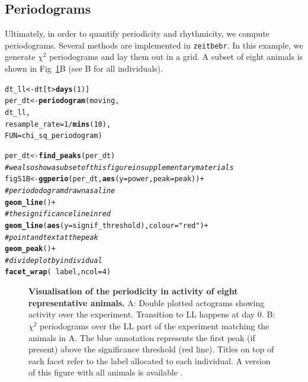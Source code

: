\documentclass[10pt,letterpaper]{article}\usepackage[]{graphicx}\usepackage[]{color}
\makeatletter
\newcommand{\hlnum}[1]{\textcolor[rgb]{0.686,0.059,0.569}{#1}}%
\newcommand{\hlstr}[1]{\textcolor[rgb]{0.192,0.494,0.8}{#1}}%
\newcommand{\hlcom}[1]{\textcolor[rgb]{0.678,0.584,0.686}{\textit{#1}}}%
\newcommand{\hlopt}[1]{\textcolor[rgb]{0,0,0}{#1}}%
\newcommand{\hlstd}[1]{\textcolor[rgb]{0.345,0.345,0.345}{#1}}%
\newcommand{\hlkwb}[1]{\textcolor[rgb]{0.69,0.353,0.396}{#1}}%
\newcommand{\hlkwc}[1]{\textcolor[rgb]{0.333,0.667,0.333}{#1}}%
\newcommand{\hlkwd}[1]{\textcolor[rgb]{0.737,0.353,0.396}{\textbf{#1}}}%
\newenvironment{kframe}{%
 \def\at@end@of@kframe{}%
 \ifinner\ifhmode%
  \def\at@end@of@kframe{\end{minipage}}%
  \begin{minipage}{\columnwidth}%
 \fi\fi%
 \def\FrameCommand##1{\hskip\@totalleftmargin \hskip-\fboxsep
 \colorbox{shadecolor}{##1}\hskip-\fboxsep
     \hskip-\linewidth \hskip-\@totalleftmargin \hskip\columnwidth}%
 \MakeFramed {\advance\hsize-\width
   \@totalleftmargin\z@ \linewidth\hsize
   \@setminipage}}%
 {\par\unskip\endMakeFramed%
 \at@end@of@kframe}
\newenvironment{knitrout}{}{} %
\makeatother
\begin{document}
\subsection*{Periodograms}
Ultimately, in order to quantify periodicity and rhythmicity, we compute periodograms.
Several methods are implemented in \texttt{zeitbebr}. In this example, we generate $\chi{}^2$ periodograms and lay them out in a grid.
A subset of eight animals is shown in Fig~\ref{fig:fig-4}B (see B for all individuals).

\begin{knitrout}
\color{fgcolor}\begin{kframe}
\begin{alltt}
\hlstd{dt_ll} \hlkwb{<-} \hlstd{dt[t} \hlopt{>} \hlkwd{days}\hlstd{(}\hlnum{1}\hlstd{)]}
\hlstd{per_dt} \hlkwb{<-} \hlkwd{periodogram}\hlstd{(moving,}
                        \hlstd{dt_ll,}
                        \hlkwc{resample_rate} \hlstd{=} \hlnum{1}\hlopt{/}\hlkwd{mins}\hlstd{(}\hlnum{10}\hlstd{),}
                        \hlkwc{FUN}\hlstd{=chi_sq_periodogram)}

\hlstd{per_dt} \hlkwb{<-} \hlkwd{find_peaks}\hlstd{(per_dt)}
\hlcom{# we also show a subset of this figure in supplementary materials}
\hlstd{figS1B} \hlkwb{<-} \hlkwd{ggperio}\hlstd{(per_dt,} \hlkwd{aes}\hlstd{(}\hlkwc{y} \hlstd{= power,} \hlkwc{peak}\hlstd{=peak))} \hlopt{+}
                  \hlcom{# periododogram drawn as a line}
                  \hlkwd{geom_line}\hlstd{()} \hlopt{+}
                  \hlcom{# the significance line in red}
                  \hlkwd{geom_line}\hlstd{(}\hlkwd{aes}\hlstd{(}\hlkwc{y} \hlstd{= signif_threshold),} \hlkwc{colour}\hlstd{=}\hlstr{"red"}\hlstd{)} \hlopt{+}
                  \hlcom{# point and text at the peak}
                  \hlkwd{geom_peak}\hlstd{()} \hlopt{+}
                  \hlcom{# divide plot by individual}
                  \hlkwd{facet_wrap}\hlstd{(} \hlopt{~} \hlstd{label,} \hlkwc{ncol} \hlstd{=} \hlnum{4}\hlstd{)}
\end{alltt}
\end{kframe}
\end{knitrout}







\begin{figure}[!h]
	\caption{{\bf Visualisation of the periodicity in activity of eight representative animals.}
		A: Double plotted actograms showing activity over the experiment. Transition to LL happens at day 0.
		B: $\chi{}^2$ periodograms over the LL part of the experiment matching the animals in A.
		The blue annotation represents the first peak (if present) above the significance threshold (red line).
		Titles on top of each facet refer to the label allocated to each individual.
		A version of this figure with all animals is available .
	}
	\label{fig:fig-4}
\end{figure}
\end{document}
